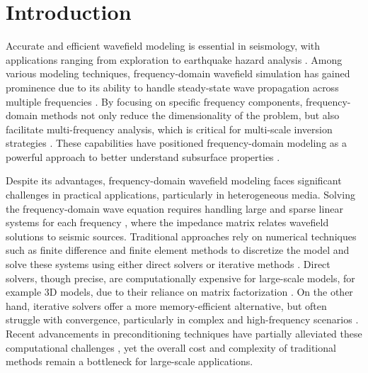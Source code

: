 \section{\textbf{Introduction}}
Accurate and efficient wavefield modeling is essential in seismology, with applications ranging from exploration to earthquake hazard analysis \citep{carcione2002seismic, fichtner2010full}. Among various modeling techniques, frequency-domain wavefield simulation has gained prominence due to its ability to handle steady-state wave propagation across multiple frequencies \citep{marfurt1984accuracy}. By focusing on specific frequency components, frequency-domain methods not only reduce the dimensionality of the problem, but also facilitate multi-frequency analysis, which is critical for multi-scale inversion strategies \citep{pratt1999seismicpart1, pratt1999seismicpart2}. These capabilities have positioned frequency-domain modeling as a powerful approach to better understand subsurface properties \citep{pratt1990frequency}. 

Despite its advantages, frequency-domain wavefield modeling faces significant challenges in practical applications, particularly in heterogeneous media. Solving the frequency-domain wave equation requires handling large and sparse linear systems for each frequency \citep{marfurt1984accuracy, pratt1999seismicpart1}, where the impedance matrix relates wavefield solutions to seismic sources. Traditional approaches rely on numerical techniques such as finite difference and finite element methods to discretize the model and solve these systems using either direct solvers \citep{operto20073d} or iterative methods \citep{riyanti2006new, plessix2009three, petrov20123d, wu2018efficient}. Direct solvers, though precise, are computationally expensive for large-scale models, for example 3D models, due to their reliance on matrix factorization \citep{plessix2009three}. On the other hand, iterative solvers offer a more memory-efficient alternative, but often struggle with convergence, particularly in complex and high-frequency scenarios \citep{yang2004optimal, huang2021finite}. Recent advancements in preconditioning techniques have partially alleviated these computational challenges \citep{sheikh2016accelerating, belonosov2017iterative}, yet the overall cost and complexity of traditional methods remain a bottleneck for large-scale applications. 


